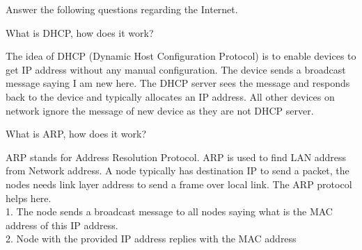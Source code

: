 \documentclass[answers,addpoints]{exam}
\begin{document}
\begin{questions}
\question 
Answer the following questions regarding the Internet.

\question 
What is DHCP, how does it work?
\fillwithdottedlines{1in}
\begin{solution} 
The idea of DHCP (Dynamic Host Configuration Protocol) is to enable devices to get IP address without any manual configuration. The device sends a broadcast message saying I am new here. The DHCP server sees the message and responds back to the device and typically allocates an IP address. All other devices on network ignore the message of new device as they are not DHCP server.
\end{solution} 

\question 
What is ARP, how does it work?
\fillwithdottedlines{1in}
\begin{solution} 
ARP stands for Address Resolution Protocol. ARP is used to find LAN address from Network address. A node typically has destination IP to send a packet, the nodes needs link layer address to send a frame over local link. The ARP protocol helps here.\\
1. The node sends a broadcast message to all nodes saying what is the MAC address of this IP address.\\
2. Node with the provided IP address replies with the MAC address
\end{solution} 


\end{questions}
\end{document}

